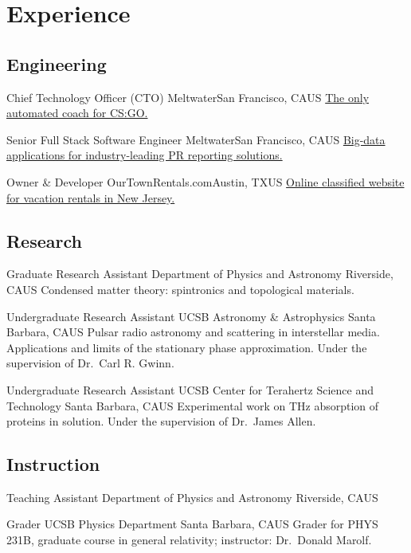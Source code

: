 \documentclass[10pt,letter]{moderncv}
\begin{document}
  \section{Experience}

  \subsection{Engineering}

    {Chief Technology Officer (CTO)}
    {Meltwater}{San Francisco, CA}{US}
    {\href{https://pureskill.gg}
      {The only automated coach for CS:GO.}}

    {Senior Full Stack Software Engineer}
    {Meltwater}{San Francisco, CA}{US}
    {\href{https://www.meltwater.com}
      {Big-data applications for industry-leading PR reporting solutions.}}

    {Owner \& Developer}
    {OurTownRentals.com}{Austin, TX}{US}
    {\href{https://ourtownrentals.com}
      {Online classified website for vacation rentals in New Jersey.}}

  \subsection{Research}

    {Graduate Research Assistant}
    {Department of Physics and Astronomy}
    {Riverside, CA}{US}
    {Condensed matter theory: spintronics and topological materials.}

    {Undergraduate Research Assistant}
    {UCSB Astronomy \& Astrophysics}
    {Santa Barbara, CA}{US}
    {Pulsar radio astronomy and scattering in interstellar media.
      Applications and limits of the stationary phase approximation.
      Under the supervision of Dr.~Carl R. Gwinn.}

    {Undergraduate Research Assistant}
    {UCSB Center for Terahertz Science and Technology}
    {Santa Barbara, CA}{US}
    {Experimental work on THz absorption of proteins in solution.
      Under the supervision of Dr.~James Allen.}

  \subsection{Instruction}

    {Teaching Assistant}
    {Department of Physics and Astronomy}
    {Riverside, CA}{US}{}

    {Grader}
    {UCSB Physics Department}
    {Santa Barbara, CA}{US}
    {Grader for PHYS 231B, graduate course in general relativity; instructor: Dr.~Donald Marolf.}
\end{document}
